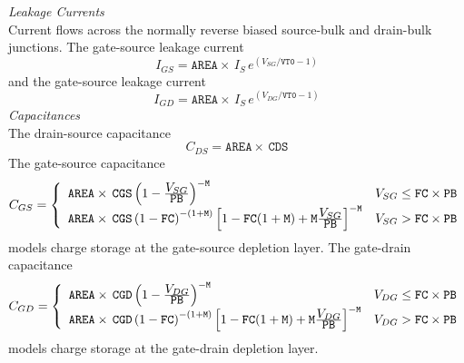 \documentclass{article}
\begin{document}
\noindent \textit{Leakage Currents}\\
Current flows across the normally reverse biased source-bulk and
drain-bulk junctions. The gate-source leakage current
\begin{equation}
I_{GS} = \texttt{AREA} \times \, I_{S} \, e^{(\textstyle
V_{SG}/\texttt{VT0} -1)}
\end{equation}
and the gate-source leakage current
\begin{equation}
I_{GD} = \texttt{AREA} \times \, I_{S} \, e^{(\textstyle
V_{DG}/\texttt{VT0} -1)}
\end{equation}
\newline
\noindent \textit{Capacitances}\\
The drain-source capacitance
\begin{equation}
C_{DS} = \texttt{AREA} \times \, \texttt{CDS}
\end{equation}
The gate-source capacitance
\begin{equation}
C_{GS} = \left\{ \begin{array}{ll}
         \texttt{AREA} \times \,\texttt{CGS}\left(1 - {{\textstyle V_{SG}}\over{\textstyle \texttt{PB}}}
         \right)^{-\texttt{M}}
         & V_{SG} \le \texttt{FC} \times \texttt{PB}\\
         \texttt{AREA} \times \,\texttt{CGS}\left(1 -\texttt{FC}\right)^{-(1+\texttt{M})}
         \left[1-\texttt{FC}(1+\texttt{M})+\texttt{M} {{\textstyle V_{SG}}\over{\textstyle \texttt{PB}}}
         \right]^{-\texttt{M}}
         & V_{SG} > \texttt{FC} \times \texttt{PB}
         \end{array} \right. %
\end{equation}
models charge storage at the gate-source depletion layer. The
gate-drain capacitance
\begin{equation}
C_{GD} = \left\{ \begin{array}{ll}
         \texttt{AREA} \times \,\texttt{CGD}\left(1 - {{\textstyle V_{DG}}\over{\textstyle \texttt{PB}}}
         \right)^{-\texttt{M}}
         & V_{DG} \le \texttt{FC} \times \texttt{PB}\\
         \texttt{AREA} \times \,\texttt{CGD}\left(1 -\texttt{FC}\right)^{-(1+\texttt{M})}
         \left[1-\texttt{FC}(1+\texttt{M})+\texttt{M} {{\textstyle V_{DG}}\over{\textstyle \texttt{PB}}}
         \right]^{-\texttt{M}}
         & V_{DG} > \texttt{FC} \times \texttt{PB}
         \end{array} \right. %
\end{equation}
models charge storage at the gate-drain depletion layer.
\end{document}
